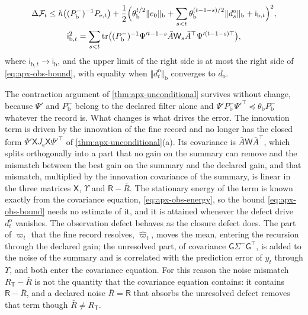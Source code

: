 \begin{theorem}
\begin{enumerate}
\begin{equation}
\begin{gathered}
\Delta\mathcal F_t\le h\bigl((P^-_{\mathrm b})^{-1}P_{\mathrm e,t}\bigr)+\frac12\Bigl(\theta_{\mathrm b}^{t/2}\Vert e_0\Vert_{\mathrm b}+\sum_{s<t}\theta_{\mathrm b}^{(t-1-s)/2}\Vert d^{\mathrm o}_s\Vert_{\mathrm b}+\mathsf i_{\mathrm b,t}\Bigr)^2 ,\\
\mathsf i_{\mathrm b,t}^2=\sum_{s<t}\operatorname{tr}\bigl((P^-_{\mathrm b})^{-1}\Psi'^{t-1-s}\bar A\mathsf W_s\bar A^\top\Psi'^{(t-1-s)\top}\bigr),
\end{gathered}
\end{equation}
where $\mathsf i_{\mathrm b,t}\to\mathsf i_{\mathrm b}$, and the upper limit of the right side is at most the right side of \eqref{eq:apx-obs-bound}, with equality when $\Vert d^{\mathrm o}_t\Vert_{\mathrm b}$ converges to $\bar d_{\mathrm o}$.
\end{enumerate}
\end{theorem}

The contraction argument of \cref{thm:apx-unconditional} survives without change, because $\Psi'$ and $P^-_{\mathrm b}$ belong to the declared filter alone and $\Psi'P^-_{\mathrm b}\Psi'^\top\preceq\theta_{\mathrm b}P^-_{\mathrm b}$ whatever the record is. What changes is what drives the error. The innovation term is driven by the innovation of the fine record and no longer has the closed form $\Psi'\mathsf XJ_{\mathrm e}\mathsf X\Psi'^\top$ of \cref{thm:apx-unconditional}(a). Its covariance is $\bar A\mathsf W\bar A^\top$, which splits orthogonally into a part that no gain on the summary can remove and the mismatch between the best gain on the summary and the declared gain, and that mismatch, multiplied by the innovation covariance of the summary, is linear in the three matrices $\mathsf X$, $\Upsilon$ and $\mathsf R-\bar R$. The stationary energy of the term is known exactly from the covariance equation, \eqref{eq:apx-obs-energy}, so the bound \eqref{eq:apx-obs-bound} needs no estimate of it, and it is attained whenever the defect drive $d^{\mathrm o}_t$ vanishes. The observation defect behaves as the closure defect does. The part of $\varpi_t$ that the fine record resolves, $\hat\varpi_t$, moves the mean, entering the recursion through the declared gain; the unresolved part, of covariance $\mathsf G\Sigma^-\mathsf G^\top$, is added to the noise of the summary and is correlated with the prediction error of $y_t$ through $\Upsilon$, and both enter the covariance equation. For this reason the noise mismatch $R_{\mathsf T}-\bar R$ is not the quantity that the covariance equation contains: it contains $\mathsf R-\bar R$, and a declared noise $\bar R=\mathsf R$ that absorbs the unresolved defect removes that term though $\bar R\ne R_{\mathsf T}$.

